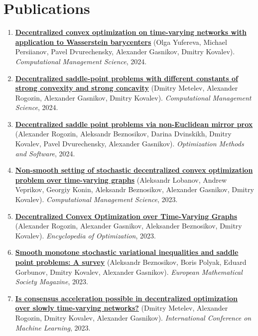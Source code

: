 \section{Publications}
\begin{enumerate}
\item
\textbf{\href{https://link.springer.com/article/10.1007/s10287-023-00493-9}{Decentralized convex optimization on time-varying networks with application to Wasserstein barycenters}} (Olga Yufereva, Michael Persiianov, Pavel Dvurechensky, Alexander Gasnikov, Dmitry Kovalev). \textit{Computational Management Science}, 2024.
\item
\textbf{\href{https://link.springer.com/article/10.1007/s10287-023-00485-9}{Decentralized saddle-point problems with different constants of strong convexity and strong concavity}} (Dmitry Metelev, Alexander Rogozin, Alexander Gasnikov, Dmitry Kovalev). \textit{Computational Management Science}, 2024.
\item
\textbf{\href{https://www.tandfonline.com/doi/abs/10.1080/10556788.2023.2280062}{Decentralized saddle point problems via non-Euclidean mirror prox}} (Alexander Rogozin, Aleksandr Beznosikov, Darina Dvinskikh, Dmitry Kovalev, Pavel Dvurechensky, Alexander Gasnikov). \textit{Optimization Methods and Software}, 2024.
\item
\textbf{\href{https://link.springer.com/article/10.1007/s10287-023-00479-7}{Non-smooth setting of stochastic decentralized convex optimization problem over time-varying graphs}} (Aleksandr Lobanov, Andrew Veprikov, Georgiy Konin, Aleksandr Beznosikov, Alexander Gasnikov, Dmitry Kovalev). \textit{Computational Management Science}, 2023.
\item
\textbf{\href{https://link.springer.com/content/pdf/10.1007/978-3-030-54621-2_860-1.pdf}{Decentralized Convex Optimization over Time-Varying Graphs}} (Alexander Rogozin, Alexander Gasnikov, Aleksander Beznosikov, Dmitry Kovalev). \textit{Encyclopedia of Optimization}, 2023.
\item
\textbf{\href{https://ems.press/journals/mag/articles/9939904}{Smooth monotone stochastic variational inequalities and saddle point problems: A survey}} (Aleksandr Beznosikov, Boris Polyak, Eduard Gorbunov, Dmitry Kovalev, Alexander Gasnikov). \textit{European Mathematical Society Magazine}, 2023.
\item
\textbf{\href{https://proceedings.mlr.press/v202/metelev23a.html}{Is consensus acceleration possible in decentralized optimization over slowly time-varying networks?}} (Dmitry Metelev, Alexander Rogozin, Dmitry Kovalev, Alexander Gasnikov). \textit{International Conference on Machine Learning}, 2023.

\end{enumerate}
